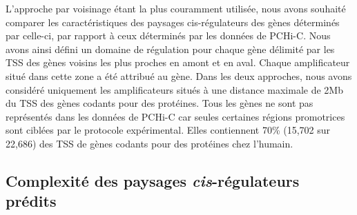 L’approche par voisinage étant la plus couramment utilisée, nous avons souhaité comparer les caractéristiques des paysages \gls{cis}-régulateurs des gènes déterminés par celle-ci, par rapport à ceux déterminés par les données de \gls{PCHi-C}. Nous avons ainsi défini un domaine de régulation pour chaque gène délimité par les \acrshort{TSS} des gènes voisins les plus proches en amont et en aval. Chaque amplificateur situé dans cette zone a été attribué au gène. Dans les deux approches, nous avons considéré uniquement les amplificateurs situés à une distance maximale de 2Mb du \acrshort{TSS} des gènes codants pour des protéines. Tous les gènes ne sont pas représentés dans les données de \gls{PCHi-C} car seules certaines régions promotrices sont ciblées par le protocole expérimental. Elles contiennent 70\% (15,702 sur 22,686) des \acrshort{TSS} de gènes codants pour des protéines chez l’humain. 

\subsection{Complexité des paysages \textit{cis}-régulateurs prédits}
\label{subsec:complexité-predit}

